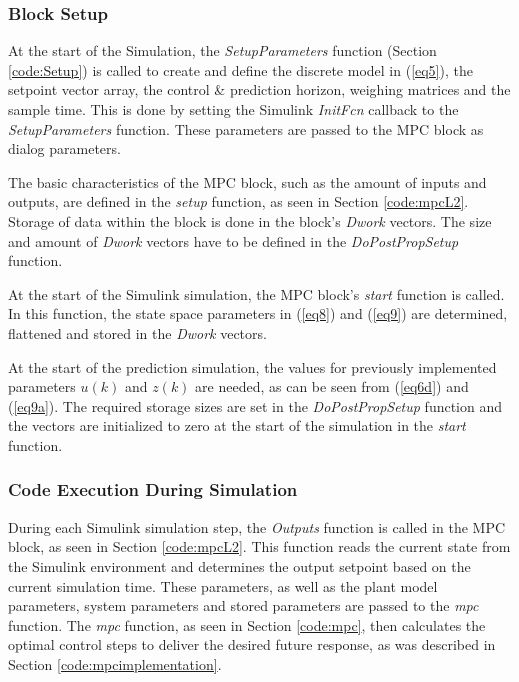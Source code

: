 \documentclass[12pt]{article}
\begin{document}
\subsubsection{Block Setup}

At the start of the Simulation, the \textit{SetupParameters} function (Section \ref{code:Setup}) is called to create and define the discrete model in (\ref{eq5}), the setpoint vector array, the control \& prediction horizon, weighing matrices and the sample time. This is done by setting the Simulink \textit{InitFcn} callback to the \textit{SetupParameters} function. These parameters are passed to the MPC block as dialog parameters.

The basic characteristics of the MPC block, such as the amount of inputs and outputs, are defined in the \textit{setup} function, as seen in Section \ref{code:mpcL2}. Storage of data within the block is done in the block's \textit{Dwork} vectors. The size and amount of \textit{Dwork} vectors have to be defined in the \textit{DoPostPropSetup} function.

At the start of the Simulink simulation, the MPC block's \textit{start} function is called. In this function, the state space parameters in (\ref{eq8}) and (\ref{eq9}) are determined, flattened and stored in the \textit{Dwork} vectors.

At the start of the prediction simulation, the values for previously implemented parameters $u(k)$ and $z(k)$ are needed, as can be seen from (\ref{eq6d}) and (\ref{eq9a}). The required storage sizes are set in the \textit{DoPostPropSetup} function and the vectors are initialized to zero at the start of the simulation in the \textit{start} function.
	
\subsubsection{Code Execution During Simulation}

During each Simulink simulation step, the \textit{Outputs} function is called in the MPC block, as seen in Section \ref{code:mpcL2}. This function reads the current state from the Simulink environment and determines the output setpoint based on the current simulation time. These parameters, as well as the plant model parameters, system parameters and stored parameters are passed to the \textit{mpc} function. The \textit{mpc} function, as seen in Section \ref{code:mpc}, then calculates the optimal control steps to deliver the desired future response, as was described in Section \ref{code:mpcimplementation}.
\end{document}
